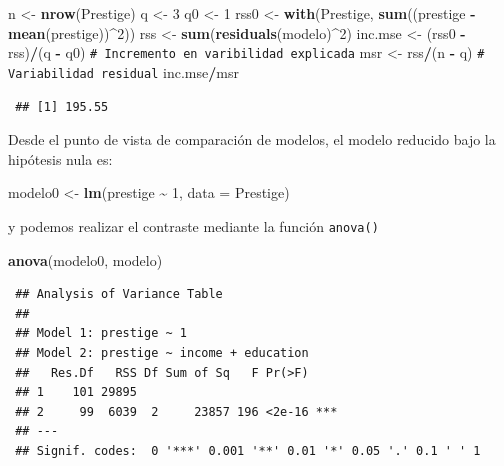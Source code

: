 \documentclass[
  spanish,
  10pt,
]{book}
\newenvironment{Shaded}{\begin{snugshade}}{\end{snugshade}}
\newcommand{\AttributeTok}[1]{\textcolor[rgb]{0.13,0.29,0.53}{#1}}
\newcommand{\CommentTok}[1]{\textcolor[rgb]{0.56,0.35,0.01}{\textit{#1}}}
\newcommand{\DecValTok}[1]{\textcolor[rgb]{0.00,0.00,0.81}{#1}}
\newcommand{\FunctionTok}[1]{\textcolor[rgb]{0.13,0.29,0.53}{\textbf{#1}}}
\newcommand{\NormalTok}[1]{#1}
\newcommand{\OtherTok}[1]{\textcolor[rgb]{0.56,0.35,0.01}{#1}}
\newcommand{\SpecialCharTok}[1]{\textcolor[rgb]{0.81,0.36,0.00}{\textbf{#1}}}
\theoremstyle{break}
\theoremstyle{nonumberplain}
\renewcommand{\CommentTok}[1]{\textcolor[rgb]{0.41,0.41,0.41}{\texttt{#1}}}
\begin{document}
\begin{Shaded}
\begin{Highlighting}[]
\NormalTok{n }\OtherTok{\textless{}{-}} \FunctionTok{nrow}\NormalTok{(Prestige)}
\NormalTok{q }\OtherTok{\textless{}{-}} \DecValTok{3}
\NormalTok{q0 }\OtherTok{\textless{}{-}} \DecValTok{1}
\NormalTok{rss0 }\OtherTok{\textless{}{-}} \FunctionTok{with}\NormalTok{(Prestige, }\FunctionTok{sum}\NormalTok{((prestige }\SpecialCharTok{{-}} \FunctionTok{mean}\NormalTok{(prestige))}\SpecialCharTok{\^{}}\DecValTok{2}\NormalTok{))}
\NormalTok{rss }\OtherTok{\textless{}{-}} \FunctionTok{sum}\NormalTok{(}\FunctionTok{residuals}\NormalTok{(modelo)}\SpecialCharTok{\^{}}\DecValTok{2}\NormalTok{)}
\NormalTok{inc.mse }\OtherTok{\textless{}{-}}\NormalTok{ (rss0 }\SpecialCharTok{{-}}\NormalTok{ rss)}\SpecialCharTok{/}\NormalTok{(q }\SpecialCharTok{{-}}\NormalTok{ q0)  }\CommentTok{\# Incremento en varibilidad explicada}
\NormalTok{msr }\OtherTok{\textless{}{-}}\NormalTok{  rss}\SpecialCharTok{/}\NormalTok{(n }\SpecialCharTok{{-}}\NormalTok{ q)               }\CommentTok{\# Variabilidad residual}
\NormalTok{inc.mse}\SpecialCharTok{/}\NormalTok{msr}
\end{Highlighting}
\end{Shaded}

\begin{verbatim}
 ## [1] 195.55
\end{verbatim}

Desde el punto de vista de comparación de modelos, el modelo
reducido bajo la hipótesis nula es:

\begin{Shaded}
\begin{Highlighting}[]
\NormalTok{modelo0 }\OtherTok{\textless{}{-}} \FunctionTok{lm}\NormalTok{(prestige }\SpecialCharTok{\textasciitilde{}} \DecValTok{1}\NormalTok{, }\AttributeTok{data =}\NormalTok{ Prestige)}
\end{Highlighting}
\end{Shaded}

y podemos realizar el contraste mediante la función \texttt{anova()}

\begin{Shaded}
\begin{Highlighting}[]
\FunctionTok{anova}\NormalTok{(modelo0, modelo)}
\end{Highlighting}
\end{Shaded}

\begin{verbatim}
 ## Analysis of Variance Table
 ## 
 ## Model 1: prestige ~ 1
 ## Model 2: prestige ~ income + education
 ##   Res.Df   RSS Df Sum of Sq   F Pr(>F)    
 ## 1    101 29895                            
 ## 2     99  6039  2     23857 196 <2e-16 ***
 ## ---
 ## Signif. codes:  0 '***' 0.001 '**' 0.01 '*' 0.05 '.' 0.1 ' ' 1
\end{verbatim}
\end{document}
